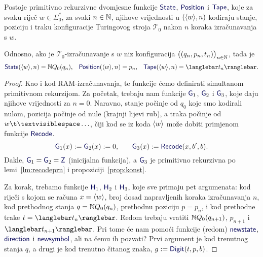 \begin{lema}\label{lm:StateHeadTapeprn}
Postoje primitivno rekurzivne dvomjesne funkcije $\f{State}$, $\f{Position}$ i $\f{Tape}$, koje za svaku riječ $w\in\Sigma_0^*$, za svaki $n\in{\mathbb N}$, njihove vrijednosti u $(\langle w\rangle,n)$ kodiraju stanje, poziciju i traku konfiguracije Turingovog stroja $\mathcal T_0$ nakon $n$ koraka izračunavanja s $w$.
\end{lema}
Odnosno, ako je $\mathcal T_0$-izračunavanje s $w$ niz konfiguracija $\bigl((q_n,p_n,t_n)\bigr)_{n\in{\mathbb N}}$, tada je
\begin{equation}
    \f{State}(\kr w,n)=\N Q_0(q_n)\text,\quad
    \f{Position}(\kr w,n)=p_n\text,\quad
    \f{Tape}(\kr w,n)=\knk{t_n}\text.
\end{equation}
\begin{proof}
Kao i kod RAM-izračunavanja, te funkcije ćemo definirati simultanom primitivnom rekurzijom. Za početak, trebaju nam funkcije $\f G_1$, $\f G_2$ i $\f G_3$, koje daju njihove vrijednosti za $n=0$. Naravno, stanje počinje od $q_0$ koje smo kodirali nulom, pozicija počinje od nule (krajnji lijevi rub), a traka počinje od $w\bl\ldots$, čiji kod se iz koda $\langle w\rangle$ može dobiti primjenom funkcije $\f{Recode}$.
\begin{equation}
    \f G_1(x):=\f G_2(x):=0\text,\qquad
    \f G_3(x):=\f{Recode}(x,b',b)\text.
\end{equation}
Dakle, $\f G_1=\f G_2=\f Z$ (inicijalna funkcija), a $\f G_3$ je primitivno rekurzivna po lemi~\ref{lm:recodeprn} i propoziciji~\ref{prop:konst}.

Za korak, trebamo funkcije $\f H_1$, $\f H_2$ i $\f H_3$, koje sve primaju pet argumenata: kod riječi s kojom se računa $x=\langle w\rangle$, broj dosad napravljenih koraka izračunavanja $n$, kod prethodnog stanja $q={\mathbb N} Q_0(q_n)$, prethodnu poziciju $p=p_n$, i kod prethodne trake $t=\knk{t_n}$. Redom trebaju vratiti ${\mathbb N} Q_0(q_{n+1})$, $p_{n+1}$ i $\knk{t_{n+1}}$. Pri tome će nam pomoći funkcije (redom) $\f{newstate}$, $\f{direction}$ i $\f{newsymbol}$, ali na čemu ih pozvati? Prvi argument je kod trenutnog stanja $q$, a drugi je kod trenutno čitanog znaka, $g:=\f{Digit}(t,p,b)$.


\end{proof}
